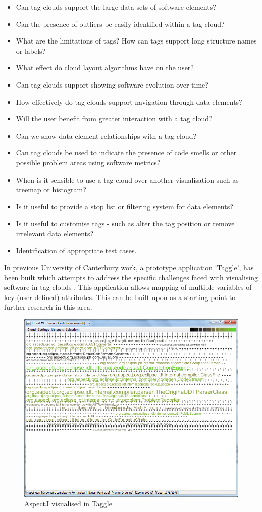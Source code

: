 \begin{itemize}
	\item Can tag clouds support the large data sets of software elements?
	\item Can the presence of outliers be easily identified within a tag cloud? %
	\item What are the limitations of tags? How can tags support long structure names or labels?
	\item What effect do cloud layout algorithms have on the user?
	\item Can tag clouds support showing software evolution over time?
	\item How effectively do tag clouds support navigation through data elements?
	\item Will the user benefit from greater interaction with a tag cloud?
	\item Can we show data element relationships with a tag cloud? %
	\item Can tag clouds be used to indicate the presence of code smells or other possible problem areas using software metrics?
	\item When is it sensible to use a tag cloud over another visualisation such as treemap or histogram?
	\item Is it useful to provide a stop list or filtering system for data elements?
	\item Is it useful to customise tags - such as alter the tag position or remove irrelevant data elements?
	\item Identification of appropriate test cases.
\end{itemize}

In previous University of Canterbury work, a prototype application `Taggle', has been built which attempts to address the specific challenges faced with visualising software in tag clouds \citep{deaker11, deaker11b, deaker11c}. This application allows mapping of multiple variables of key (user-defined) attributes. This can be built upon as a starting point to further research in this area.

\begin{figure}[h!]
   \centering
   \includegraphics[width=140mm]{aspectjtaggle.png}
  \caption{AspectJ visualised in Taggle}
\end{figure}


